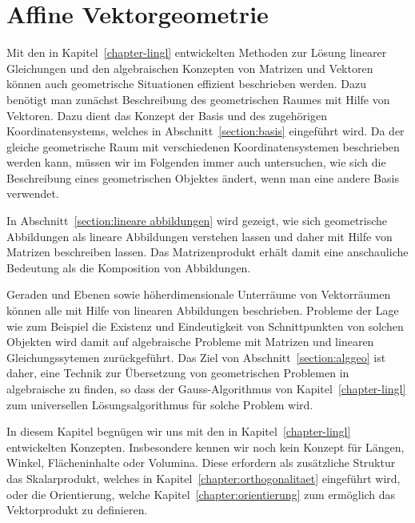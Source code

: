 %
%
%
\chapter{Affine Vektorgeometrie\label{chapter:affin}}
\rhead{}
Mit den in Kapitel~\ref{chapter-lingl} entwickelten Methoden zur Lösung
linearer Gleichungen und den algebraischen Konzepten von Matrizen und Vektoren
können auch geometrische Situationen effizient beschrieben werden.
Dazu benötigt man zunächst Beschreibung des geometrischen Raumes mit Hilfe von
Vektoren.
Dazu dient das Konzept der Basis und des zugehörigen Koordinatensystems,
welches in Abschnitt~\ref{section:basis} eingeführt wird.
Da der gleiche geometrische Raum mit verschiedenen Koordinatensystemen
beschrieben werden kann, müssen wir im Folgenden immer auch untersuchen,
wie sich die Beschreibung eines geometrischen Objektes ändert, wenn man
eine andere Basis verwendet.

In Abschnitt~\ref{section:lineare abbildungen} wird gezeigt, wie sich
geometrische Abbildungen als lineare Abbildungen verstehen lassen und
daher mit Hilfe von Matrizen beschreiben lassen.
Das Matrizenprodukt erhält damit eine anschauliche Bedeutung als die
Komposition von Abbildungen.

Geraden und Ebenen sowie höherdimensionale Unterräume von Vektorräumen
können alle mit Hilfe von linearen Abbildungen beschrieben.
Probleme der Lage wie zum Beispiel die Existenz und Eindeutigkeit von
Schnittpunkten von solchen Objekten wird damit auf algebraische Probleme
mit Matrizen und linearen Gleichungssytemen zurückgeführt.
Das Ziel von Abschnitt~\ref{section:alggeo} ist daher, eine Technik
zur Übersetzung von geometrischen Problemen in algebraische zu finden,
so dass der Gauss-Algorithmus von Kapitel~\ref{chapter-lingl} zum universellen
Lösungsalgorithmus für solche Problem wird.

In diesem Kapitel begnügen wir uns mit den in Kapitel~\ref{chapter-lingl}
entwickelten Konzepten.
Insbesondere kennen wir noch kein Konzept für Längen, Winkel,
Flächeninhalte oder Volumina.
Diese erfordern als zusätzliche Struktur das Skalarprodukt, welches in
Kapitel~\ref{chapter:orthogonalitaet} eingeführt wird, oder die Orientierung,
welche Kapitel~\ref{chapter:orientierung} zum ermöglich das Vektorprodukt
zu definieren.














